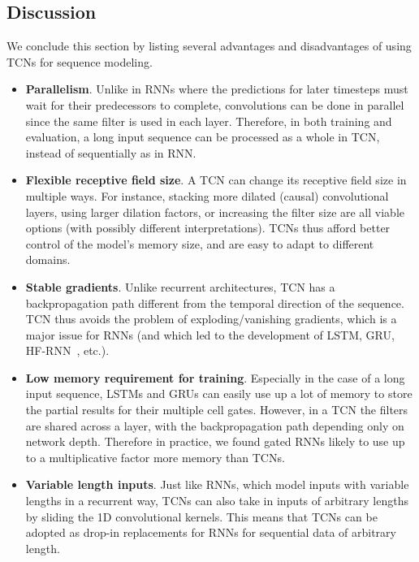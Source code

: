 \documentclass{article}
\begin{document}
\subsection{Discussion}

We conclude this section by listing several advantages and disadvantages of using
TCNs for sequence modeling.

\vspace{-.1in}
\begin{itemize}[leftmargin=*]
\setlength{\itemsep}{0mm}
\setlength{\parskip}{1mm}{}
\item \textbf{Parallelism}. Unlike in RNNs where the predictions for later timesteps
must wait for their predecessors to complete, convolutions can be done in parallel
since the same filter is used in each layer. Therefore, in both training and evaluation,
a long input sequence can be processed as a whole in TCN, instead of sequentially as in RNN.

\item \textbf{Flexible receptive field size}. A TCN can change
its receptive field size in multiple ways. For instance, stacking more
dilated (causal) convolutional layers, using larger dilation factors, or
increasing the filter size are all viable options (with possibly different
interpretations). TCNs thus afford better control of the model's memory size,
and are easy to adapt to different domains.

\item \textbf{Stable gradients}. Unlike recurrent architectures, TCN has
a backpropagation path different from the temporal direction of the
sequence. TCN thus avoids the problem of exploding/vanishing
gradients, which is a major issue for RNNs (and which led to the
development of LSTM, GRU, HF-RNN~\citep{MartensRNNHF}, etc.).

\item \textbf{Low memory requirement for training}. Especially in
the case of a long input sequence, LSTMs and GRUs can easily use up a lot
of memory to store the partial results for their multiple cell gates. However,
in a TCN the filters are shared across a layer, with the backpropagation path depending only
on network depth. Therefore in practice, we found gated RNNs likely to use up to a
multiplicative factor more memory than TCNs.

\item \textbf{Variable length inputs}. Just like RNNs, which model inputs with
variable lengths in a recurrent way, TCNs can also take in inputs of arbitrary
lengths by sliding the 1D convolutional kernels. This means that TCNs can be adopted as
drop-in replacements for RNNs for sequential data of arbitrary length.
\end{itemize}
\end{document}
